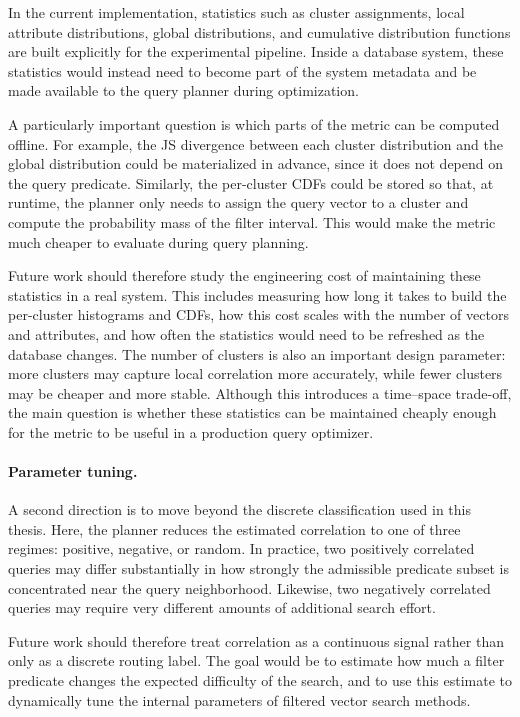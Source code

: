 In the current implementation, statistics such as cluster assignments, local attribute distributions, global distributions, and cumulative distribution functions are built explicitly for the experimental pipeline.
Inside a database system, these statistics would instead need to become part of the system metadata and be made available to the query planner during optimization.

A particularly important question is which parts of the metric can be computed offline.
For example, the JS divergence between each cluster distribution and the global distribution could be materialized in advance, since it does not depend on the query predicate.
Similarly, the per-cluster CDFs could be stored so that, at runtime, the planner only needs to assign the query vector to a cluster and compute the probability mass of the filter interval.
This would make the metric much cheaper to evaluate during query planning.

Future work should therefore study the engineering cost of maintaining these statistics in a real system.
This includes measuring how long it takes to build the per-cluster histograms and CDFs, how this cost scales with the number of vectors and attributes, and how often the statistics would need to be refreshed as the database changes.
The number of clusters is also an important design parameter: more clusters may capture local correlation more accurately, while fewer clusters may be cheaper and more stable.
Although this introduces a time--space trade-off, the main question is whether these statistics can be maintained cheaply enough for the metric to be useful in a production query optimizer.

\paragraph{Parameter tuning.}

A second direction is to move beyond the discrete classification used in this thesis.
Here, the planner reduces the estimated correlation to one of three regimes: positive, negative, or random.
In practice, two positively correlated queries may differ substantially in how strongly the admissible predicate subset is concentrated near the query neighborhood.
Likewise, two negatively correlated queries may require very different amounts of additional search effort.

Future work should therefore treat correlation as a continuous signal rather than only as a discrete routing label.
The goal would be to estimate how much a filter predicate changes the expected difficulty of the search, and to use this estimate to dynamically tune the internal parameters of filtered vector search methods.

